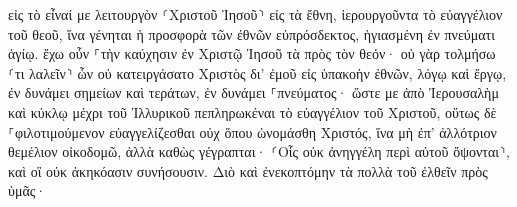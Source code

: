 \documentclass{openreader}
\begin{document}
εἰς τὸ εἶναί με λειτουργὸν ⸂Χριστοῦ Ἰησοῦ⸃ εἰς τὰ ἔθνη, ἱερουργοῦντα τὸ εὐαγγέλιον τοῦ θεοῦ, ἵνα γένηται ἡ προσφορὰ τῶν ἐθνῶν εὐπρόσδεκτος, ἡγιασμένη ἐν πνεύματι ἁγίῳ. 
ἔχω οὖν ⸀τὴν καύχησιν ἐν Χριστῷ Ἰησοῦ τὰ πρὸς τὸν θεόν· 
οὐ γὰρ τολμήσω ⸂τι λαλεῖν⸃ ὧν οὐ κατειργάσατο Χριστὸς δι’ ἐμοῦ εἰς ὑπακοὴν ἐθνῶν, λόγῳ καὶ ἔργῳ, 
ἐν δυνάμει σημείων καὶ τεράτων, ἐν δυνάμει ⸀πνεύματος· ὥστε με ἀπὸ Ἰερουσαλὴμ καὶ κύκλῳ μέχρι τοῦ Ἰλλυρικοῦ πεπληρωκέναι τὸ εὐαγγέλιον τοῦ Χριστοῦ, 
οὕτως δὲ ⸀φιλοτιμούμενον εὐαγγελίζεσθαι οὐχ ὅπου ὠνομάσθη Χριστός, ἵνα μὴ ἐπ’ ἀλλότριον θεμέλιον οἰκοδομῶ, 
ἀλλὰ καθὼς γέγραπται· ⸂Οἷς οὐκ ἀνηγγέλη περὶ αὐτοῦ ὄψονται⸃, καὶ οἳ οὐκ ἀκηκόασιν συνήσουσιν. 
Διὸ καὶ ἐνεκοπτόμην τὰ πολλὰ τοῦ ἐλθεῖν πρὸς ὑμᾶς· 
\end{document}
